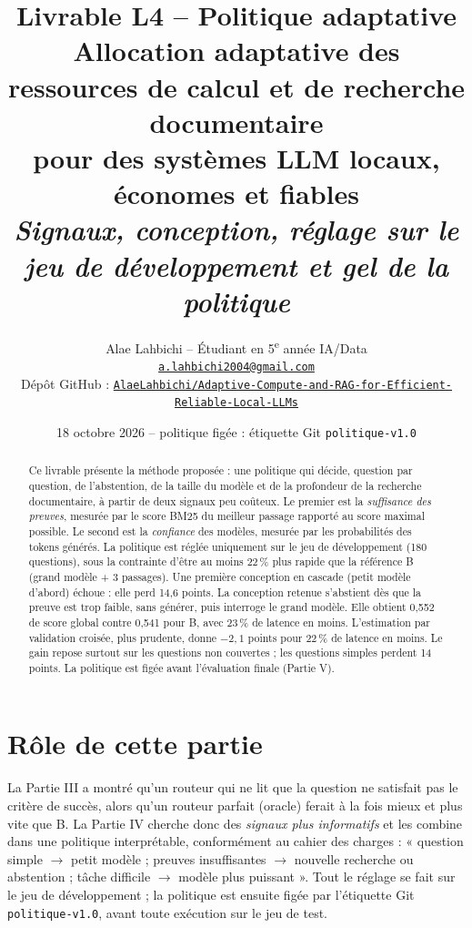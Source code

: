 \documentclass[11pt,a4paper]{article}
\title{\textbf{Livrable L4 -- Politique adaptative}\\[4pt]
\large Allocation adaptative des ressources de calcul et de recherche documentaire\\ pour des systèmes LLM locaux, économes et fiables\\[2pt]
\normalsize\textit{Signaux, conception, réglage sur le jeu de développement et gel de la politique}}
\author{Alae Lahbichi -- Étudiant en 5\textsuperscript{e} année IA/Data\\[2pt]
\small\href{mailto:a.lahbichi2004@gmail.com}{\texttt{a.lahbichi2004@gmail.com}}\\
\small Dépôt GitHub : \href{https://github.com/AlaeLahbichi/Adaptive-Compute-and-RAG-for-Efficient-Reliable-Local-LLMs}{\footnotesize\texttt{AlaeLahbichi/Adaptive-Compute-and-RAG-for-Efficient-Reliable-Local-LLMs}}}
\date{18 octobre 2026 -- politique figée : étiquette Git \texttt{politique-v1.0}}
\begin{document}
\maketitle

\begin{abstract}
\noindent Ce livrable présente la méthode proposée : une politique qui décide, question par question,
de l'abstention, de la taille du modèle et de la profondeur de la recherche documentaire, à partir de
deux signaux peu coûteux. Le premier est la \emph{suffisance des preuves}, mesurée par le score BM25 du
meilleur passage rapporté au score maximal possible. Le second est la \emph{confiance} des modèles,
mesurée par les probabilités des tokens générés. La politique est réglée uniquement sur le jeu de
développement (180 questions), sous la contrainte d'être au moins 22\,\% plus rapide que la référence B
(grand modèle + 3 passages). Une première conception en cascade (petit modèle d'abord) échoue : elle
perd 14,6 points. La conception retenue s'abstient dès que la preuve est trop faible, sans générer, puis
interroge le grand modèle. Elle obtient 0,552 de score global contre 0,541 pour B, avec 23\,\% de
latence en moins. L'estimation par validation croisée, plus prudente, donne $-2{,}1$ points pour 22\,\%
de latence en moins. Le gain repose surtout sur les questions non couvertes ; les questions simples
perdent 14 points. La politique est figée avant l'évaluation finale (Partie V).
\end{abstract}

\clearpage
\tableofcontents
\clearpage

\section{Rôle de cette partie}

La Partie III a montré qu'un routeur qui ne lit que la question ne satisfait pas le critère de succès,
alors qu'un routeur parfait (oracle) ferait à la fois mieux et plus vite que B. La Partie IV cherche
donc des \emph{signaux plus informatifs} et les combine dans une politique interprétable, conformément
au cahier des charges : « question simple $\rightarrow$ petit modèle ; preuves insuffisantes $\rightarrow$
nouvelle recherche ou abstention ; tâche difficile $\rightarrow$ modèle plus puissant ». Tout le réglage
se fait sur le jeu de développement ; la politique est ensuite figée par l'étiquette Git
\texttt{politique-v1.0}, avant toute exécution sur le jeu de test.
\end{document}
